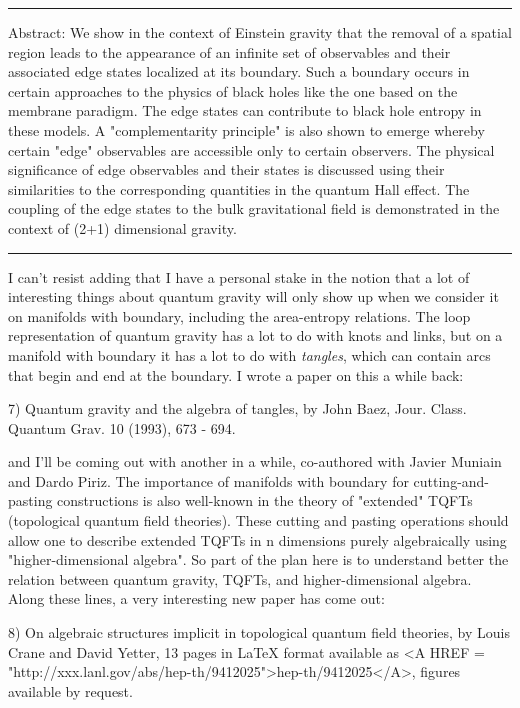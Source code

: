 \par\noindent\rule{\textwidth}{0.4pt}
Abstract: We show in the context of Einstein gravity that the removal of
a spatial region leads to the appearance of an infinite set of
observables and their associated edge states localized at its boundary.
Such a boundary occurs in certain approaches to the physics of black
holes like the one based on the membrane paradigm. The edge states can
contribute to black hole entropy in these models. A "complementarity
principle" is also shown to emerge whereby certain "edge" observables
are accessible only to certain observers. The physical significance of
edge observables and their states is discussed using their similarities
to the corresponding quantities in the quantum Hall effect.  The
coupling of the edge states to the bulk gravitational field is
demonstrated in the context of (2+1) dimensional gravity.
\par\noindent\rule{\textwidth}{0.4pt}

I can't resist adding that I have a personal stake in the notion that a
lot of interesting things about quantum gravity will only show up when
we consider it on manifolds with boundary, including the area-entropy
relations.  The loop representation of quantum gravity has a lot to do
with knots and links, but on a manifold with boundary it has a lot to do
with \emph{tangles}, which can contain arcs that begin and end at the
boundary.   I wrote a paper on this a while back:


7)  Quantum gravity and the algebra of tangles, by John Baez, 
Jour. Class. Quantum Grav. 10 (1993), 673 - 694.


and I'll be coming out with another in a while, co-authored with Javier
Muniain and Dardo Piriz.  The importance of manifolds with boundary for
cutting-and-pasting constructions is also well-known in the theory of
"extended" TQFTs (topological quantum field theories).  These cutting
and pasting operations should allow one to describe extended TQFTs in n
dimensions purely algebraically using "higher-dimensional algebra".  So
part of the plan here is to understand better the relation between
quantum gravity, TQFTs, and higher-dimensional algebra.  Along these
lines, a very interesting new paper has come out:


8)  On algebraic structures implicit in topological quantum field
theories, by Louis Crane and David Yetter, 13 pages in LaTeX format
available as <A HREF = "http://xxx.lanl.gov/abs/hep-th/9412025">hep-th/9412025</A>, figures available by request.  


